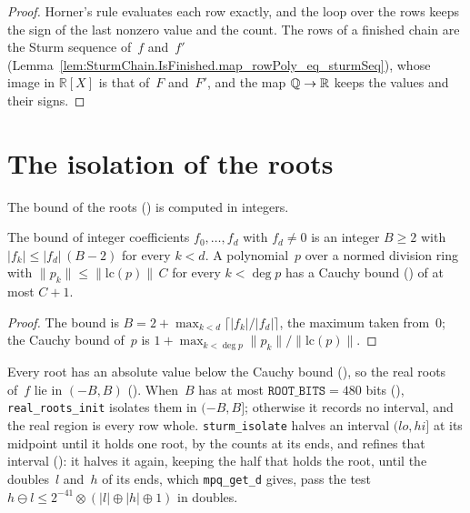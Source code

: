\begin{proof}
  \leanok
  Horner's rule evaluates each row exactly, and the loop over the rows keeps the sign of the last
  nonzero value and the count. The rows of a finished chain are the Sturm sequence of~$f$ and~$f'$
  (Lemma~\ref{lem:SturmChain.IsFinished.map_rowPoly_eq_sturmSeq}), whose image in $\mathbb{R}[X]$ is
  that of~$F$ and~$F'$, and the map $\mathbb{Q} \to \mathbb{R}$ keeps the values and their signs.
\end{proof}

\section{The isolation of the roots}\label{sec:isolation}

The bound of the roots () is computed in integers.

\begin{lemma}\label{lem:realRootsBound_spec}
  \leanok
  The bound  of integer coefficients $f_0, \dots, f_d$ with
  $f_d \ne 0$ is an integer $B \ge 2$ with $|f_k| \le |f_d|\,(B - 2)$ for every $k < d$. A
  polynomial~$p$ over a normed division ring with $\|p_k\| \le \|\mathrm{lc}(p)\|\,C$ for every
  $k < \deg p$ has a Cauchy bound () of at most $C + 1$.
\end{lemma}

\begin{proof}
  \leanok
  The bound is $B = 2 + \max_{k < d} \lceil |f_k|/|f_d| \rceil$, the maximum taken from~$0$; the
  Cauchy bound of~$p$ is $1 + \max_{k < \deg p} \|p_k\|/\|\mathrm{lc}(p)\|$.
\end{proof}

Every root has an absolute value below the Cauchy bound
(), so the real roots of~$f$ lie in $(-B, B)$
(). When~$B$ has at most
$\texttt{ROOT\_BITS} = 480$ bits (), \texttt{real\_roots\_init}
isolates them in $(-B, B]$; otherwise it records no interval, and the real region is every row
whole. \texttt{sturm\_isolate} halves an interval $(lo, hi]$ at its midpoint until it holds one
root, by the counts at its ends, and refines that interval (): it
halves it again, keeping the half that holds the root, until the doubles~$l$ and~$h$ of its ends,
which \texttt{mpq\_get\_d} gives, pass the test $h \ominus l \le 2^{-41} \otimes (|l| \oplus |h|
\oplus 1)$ in doubles.

